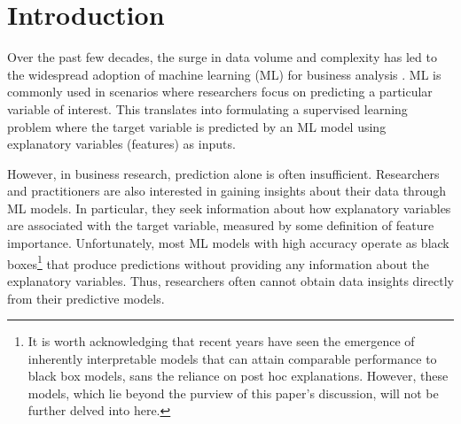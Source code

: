 \documentclass[mnsc,blindrev]{informs3}
\begin{document}
\section{Introduction}

Over the past few decades, the surge in data volume and complexity has led to the widespread adoption of machine learning (ML) for business analysis \citep{kleinberg2015prediction,mullainathan17applied}. ML is commonly used in scenarios where researchers focus on predicting a particular variable of interest. This translates into formulating a supervised learning problem where the target variable is predicted by an ML model using explanatory variables (features) as inputs.

However, in business research, prediction alone is often insufficient. Researchers and practitioners are also interested in gaining insights about their data through ML models. In particular, they seek information about how explanatory variables are associated with the target variable, measured by some definition of feature importance. %
Unfortunately, most ML models with high accuracy operate as black boxes\footnote{It is worth acknowledging that recent years have seen the emergence of inherently interpretable models that can attain comparable performance to black box models, sans the reliance on post hoc explanations. However, these models, which lie beyond the purview of this paper's discussion, will not be further delved into here.} that produce predictions without providing any information about the explanatory variables. Thus, researchers often cannot obtain data insights directly from their predictive models.
\end{document}
